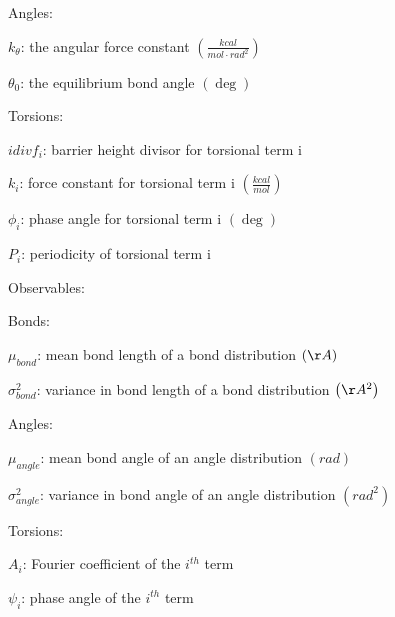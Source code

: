 \documentclass{report}
\begin{document}
\begin{outline}
\begin{outline}
\begin{outline}
        \item{Angles:}
          \begin{outline}
            \item{$k_{\theta}$: the angular force constant $\left(\frac{kcal}{mol \cdot rad^2} \right)$}
            \item{$\theta_0$: the equilibrium bond angle $\left(\deg \right)$}
          \end{outline}
        \item{Torsions:}
          \begin{outline}
            \item{$idivf_{\mathit{i}}$: barrier height divisor for torsional term i}
            \item{$k_{\mathit{i}}$: force constant for torsional term i $\left(\frac{kcal}{mol} \right)$}
            \item{$\phi_{\mathit{i}}$: phase angle for torsional term i $\left(\deg \right)$}
            \item{$P_{\mathit{i}}$: periodicity of torsional term i}
          \end{outline}
      \end{outline}
    \item{Observables:}
      \begin{outline}
        \item{Bonds:}
          \begin{outline}
            \item{$\mu_{bond}$: mean bond length of a bond distribution $\left(\AA \right)$}
            \item{$\sigma_{bond}^2$: variance in bond length of a bond distribution $\left(\AA^2 \right)$}
          \end{outline}
        \item{Angles:}
          \begin{outline}
            \item{$\mu_{angle}$: mean bond angle of an angle distribution $\left(rad \right)$}
            \item{$\sigma_{angle}^2$: variance in bond angle of an angle distribution $\left(rad^2 \right)$}
          \end{outline}
        \item{Torsions:}
          \begin{outline}
            \item{$A_{\mathit{i}}$: Fourier coefficient of the $i^{th}$ term}
            \item{$\psi_{\mathit{i}}$: phase angle of the $i^{th}$ term} 
          \end{outline}
      \end{outline}
    \end{outline}   
  \end{outline} 
\end{document}
